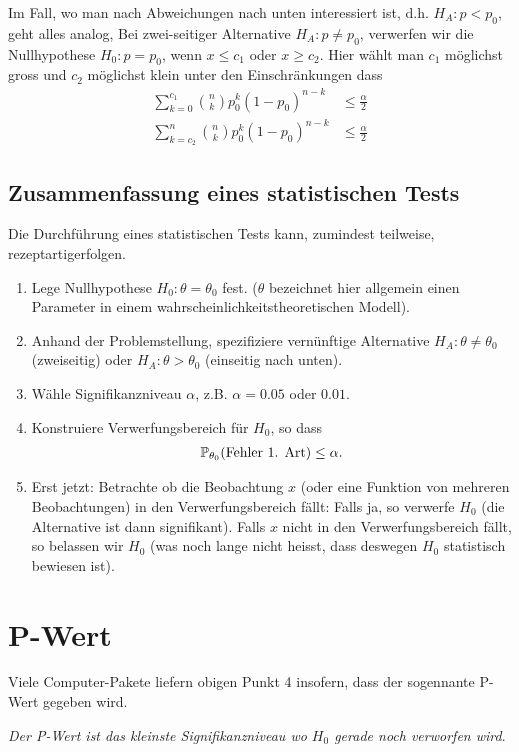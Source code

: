 Im Fall, wo man nach Abweichungen nach unten interessiert ist, d.h. $H_A: p<p_0$, geht alles analog, Bei zwei-seitiger Alternative $H_A:p\neq p_0$, verwerfen wir die Nullhypothese $H_0:p=p_0$, wenn $x\leq c_1$ oder $x\geq c_2$. Hier wählt man $c_1$ möglichst gross und $c_2$ möglichst klein unter den Einschränkungen dass
\begin{align*}
	\sum_{k=0}^{c_1}{n\choose k}p_{0}^{k}(1-p_0)^{n-k}&\leq \frac{\alpha}{2}\\
	\sum_{k=c_2}^{n}{n\choose k}p_{0}^{k}(1-p_0)^{n-k}&\leq \frac{\alpha}{2}
\end{align*}
\subsection{Zusammenfassung eines statistischen Tests}
Die Durchführung eines statistischen Tests kann, zumindest teilweise, \glqq rezeptartig\grqq erfolgen.
\begin{enumerate}[1.]
	\item Lege Nullhypothese $H_0: \theta=\theta_0$ fest. ($\theta$ bezeichnet hier allgemein einen Parameter in einem wahrscheinlichkeitstheoretischen Modell).
	\item Anhand der Problemstellung, spezifiziere vernünftige Alternative $H_A:\theta\neq \theta_0$ (zweiseitig) oder $H_A:\theta> \theta_0$ (einseitig nach unten).
	\item Wähle Signifikanzniveau $\alpha$, z.B. $\alpha=0.05$ oder $0.01$.
	\item Konstruiere Verwerfungsbereich für $H_0$, so dass 
		\begin{gather*}
			\mathbb P_{\theta_0}(\text{Fehler 1. Art})\leq \alpha.
		\end{gather*}
	\item Erst jetzt: Betrachte ob die Beobachtung $x$ (oder eine Funktion von mehreren Beobachtungen) in den Verwerfungsbereich fällt: Falls ja, so verwerfe $H_0$ (die Alternative ist dann \glqq signifikant\grqq). Falls $x$ nicht in den Verwerfungsbereich fällt, so belassen wir $H_0$ (was noch lange nicht heisst, dass deswegen $H_0$ statistisch bewiesen ist).
\end{enumerate}
\section{P-Wert}
Viele Computer-Pakete liefern obigen Punkt 4 insofern, dass der sogennante P-Wert gegeben wird.

\emph{Der P-Wert ist das kleinste Signifikanzniveau wo $H_0$ gerade noch verworfen wird}.

